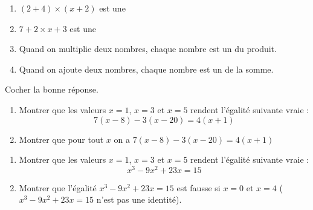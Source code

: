 \documentclass[main.tex]{subfiles}
\begin{document}
\begin{example}\hfill 
	\begin{enumerate}[label=\alph*),leftmargin=*]
		\item $(2+4)\times (x+2)$ est une \BoiteFlash{} 
		\item $7+2\times x+3$  est une \BoiteFlash{} 
		\item Quand on multiplie deux nombres, chaque nombre est un \BoiteFlash{}  du produit.
		\item Quand on ajoute deux nombres, chaque nombre est un \BoiteFlash{}  de la somme.
	\end{enumerate}
\end{example} 
\begin{exercise} Cocher la bonne réponse. 
	
	\noindent\parbox{0.48\linewidth}{
	}\hfill
	\parbox{0.50\linewidth}{
	} 
\end{exercise}  
\begin{exercise}[Identités A] \hfill 
	\begin{enumerate}[label=\alph*),leftmargin=*]
		\item Montrer que les valeurs $x=1$, $x=3$ et $x=5$  rendent l'égalité suivante vraie :
		\setlength{\abovedisplayskip}{5pt}
		\setlength{\belowdisplayskip}{5pt}
		\[ 7(x-8)-3(x-20)=4(x+1)\]
		\item Montrer que pour tout $x$   on a	$ 7(x-8)-3(x-20)=4(x+1) $
	\end{enumerate} 
\end{exercise}
\begin{exercise}[Identités B] \hfill 
	\begin{enumerate}[label=\alph*),leftmargin=*]
		\item Montrer que les valeurs $x=1$, $x=3$ et $x=5$ rendent l'égalité suivante vraie : 
		\setlength{\abovedisplayskip}{5pt}
		\setlength{\belowdisplayskip}{5pt}
		\[ x^3-9x^2+23x=15\]
		\item Montrer que l'égalité $ x^3-9x^2+23x=15$ est fausse si   $x=0$  et $x=4$ ($x^3-9x^2+23x=15$ n'est pas une identité). 
	\end{enumerate} 
\end{exercise}
\end{document}
